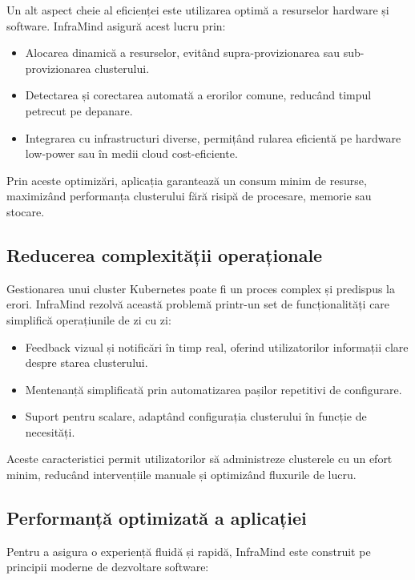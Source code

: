 \documentclass[12pt,a4paper]{report}
\begin{document}
Un alt aspect cheie al eficienței este utilizarea optimă a resurselor hardware și software. InfraMind asigură acest lucru prin:

\begin{itemize}
  \item Alocarea dinamică a resurselor, evitând supra-provizionarea sau sub-provizionarea clusterului.
  \item Detectarea și corectarea automată a erorilor comune, reducând timpul petrecut pe depanare.
  \item Integrarea cu infrastructuri diverse, permițând rularea eficientă pe hardware low-power sau în medii cloud cost-eficiente.
\end{itemize}

Prin aceste optimizări, aplicația garantează un consum minim de resurse, maximizând performanța clusterului fără risipă de procesare, memorie sau stocare.

\subsection{Reducerea complexității operaționale}

Gestionarea unui cluster Kubernetes poate fi un proces complex și predispus la erori. InfraMind rezolvă această problemă printr-un set de funcționalități care simplifică operațiunile de zi cu zi:

\begin{itemize}
  \item Feedback vizual și notificări în timp real, oferind utilizatorilor informații clare despre starea clusterului.
  \item Mentenanță simplificată prin automatizarea pașilor repetitivi de configurare.
  \item Suport pentru scalare, adaptând configurația clusterului în funcție de necesități.
\end{itemize}

Aceste caracteristici permit utilizatorilor să administreze clusterele cu un efort minim, reducând intervențiile manuale și optimizând fluxurile de lucru.

\subsection{Performanță optimizată a aplicației}

Pentru a asigura o experiență fluidă și rapidă, InfraMind este construit pe principii moderne de dezvoltare software:
\end{document}
